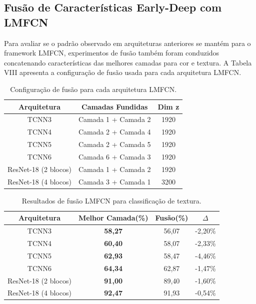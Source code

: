 \documentclass[conference]{IEEEtran}
\begin{document}
\subsection{Fus\~{a}o de Caracter\'{i}sticas Early-Deep com LMFCN}

Para avaliar se o padr\~{a}o observado em arquiteturas anteriores se mant\'{e}m para o framework LMFCN, experimentos de fus\~{a}o tamb\'{e}m foram conduzidos concatenando caracter\'{i}sticas das melhores camadas para cor e textura. A Tabela VIII apresenta a configura\c{c}\~{a}o de fus\~{a}o usada para cada arquitetura LMFCN.

\begin{table}[htbp]
\caption{Configura\c{c}\~{a}o de fus\~{a}o para cada arquitetura LMFCN.}
\begin{center}
\begin{tabular}{|c|c|c|}
\hline
\textbf{Arquitetura} & \textbf{Camadas Fundidas} & \textbf{Dim z}\\
\hline
TCNN3 & Camada 1 + Camada 2 & 1920 \\
\hline
TCNN4 & Camada 2 + Camada 4 & 1920 \\
\hline
TCNN5 & Camada 2 + Camada 5 & 1920 \\
\hline
TCNN6 & Camada 6 + Camada 3 & 1920 \\
\hline
ResNet-18 (2 blocos) & Camada 1 + Camada 2 & 1920 \\
\hline
ResNet-18 (4 blocos) & Camada 3 + Camada 1 & 3200 \\
\hline
\end{tabular}
\label{tab8}
\end{center}
\end{table}

\begin{table}[htbp]
\caption{Resultados de fus\~{a}o LMFCN para classifica\c{c}\~{a}o de textura.}
\begin{center}
\begin{tabular}{|c|c|c|c|}
\hline
\textbf{Arquitetura} & \textbf{Melhor Camada(\%)} & \textbf{Fus\~{a}o(\%)} & \textbf{$\Delta$}\\
\hline
TCNN3 & \textbf{58,27} & 56,07 & -2,20\% \\
\hline
TCNN4 & \textbf{60,40} & 58,07 & -2,33\% \\
\hline
TCNN5 & \textbf{62,93} & 58,47 & -4,46\% \\
\hline
TCNN6 & \textbf{64,34} & 62,87 & -1,47\% \\
\hline
ResNet-18 (2 blocos) & \textbf{91,00} & 89,40 & -1,60\% \\
\hline
ResNet-18 (4 blocos) & \textbf{92,47} & 91,93 & -0,54\% \\
\hline
\end{tabular}
\label{tab9}
\end{center}
\end{table}
\end{document}
